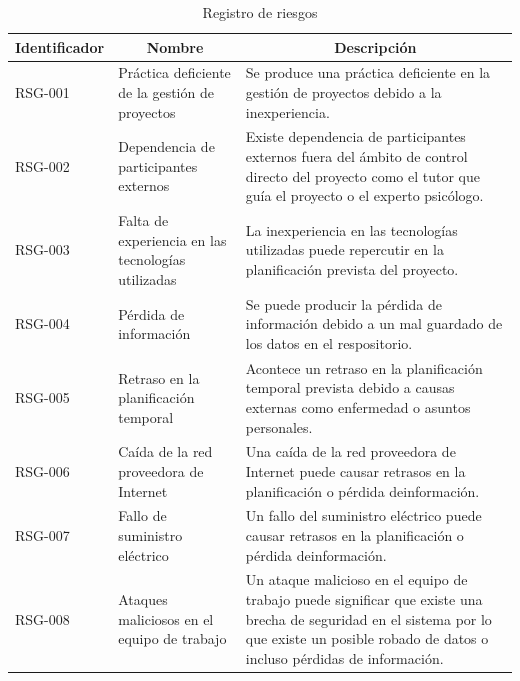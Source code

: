 \begin{table}[htpb]
\centering
\caption{Registro de riesgos}
\label{tab_reg_riesgos}
\begin{tabularx}{\textwidth}{|l|X|X|}
\hline
\multicolumn{1}{|c|}{Identificador} & \multicolumn{1}{c|}{Nombre}                        & \multicolumn{1}{c|}{Descripción}                                                                                                                                                              \\ \hline
RSG-001                             & Práctica deficiente de la gestión de proyectos     & Se produce una práctica deficiente en la gestión de proyectos debido a la inexperiencia.                                                                                                      \\ \hline
RSG-002                             & Dependencia de participantes externos              & Existe dependencia de participantes externos fuera del ámbito de control directo del proyecto como el tutor que guía el proyecto o el experto psicólogo.                                      \\ \hline
RSG-003                             & Falta de experiencia en las tecnologías utilizadas & La inexperiencia en las tecnologías utilizadas puede repercutir en la planificación prevista del proyecto.                                                                                    \\ \hline
RSG-004                             & Pérdida de información                             & Se puede producir la pérdida de información debido a un mal guardado de los datos en el respositorio.                                                                                         \\ \hline
RSG-005                             & Retraso en la planificación temporal               & Acontece un retraso en la planificación temporal prevista debido a causas externas como enfermedad o asuntos personales.                                                                      \\ \hline
RSG-006                             & Caída de la red proveedora de Internet             & Una caída de la red proveedora de Internet puede causar retrasos en la planificación o pérdida deinformación.                                                                                 \\ \hline
RSG-007                             & Fallo de suministro eléctrico                      & Un fallo del suministro eléctrico  puede causar retrasos en la planificación o pérdida deinformación.                                                                                         \\ \hline
RSG-008                             & Ataques maliciosos en el equipo de trabajo         & Un ataque malicioso en el equipo de trabajo puede significar que existe una brecha de seguridad en el sistema por lo que existe un posible robado de datos o incluso pérdidas de información. \\ \hline
\end{tabularx}
\end{table}

